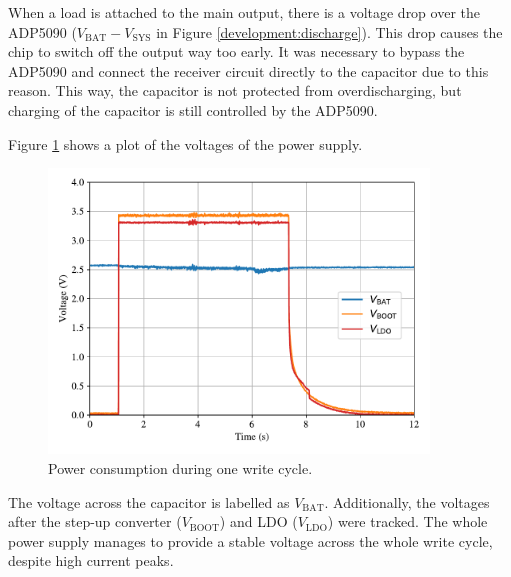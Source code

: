 When a load is attached to the main output, there is a voltage drop over the ADP5090 ($V_{\text{BAT}}-V_{\text{SYS}}$ in Figure \ref{development:discharge}). 
This drop causes the chip to switch off the output way too early.
It was necessary to bypass the ADP5090 and connect the receiver circuit directly to the capacitor due to this reason.
This way, the capacitor is not protected from overdischarging, but charging of the capacitor is still controlled by the ADP5090.

Figure \ref{results:v} shows a plot of the voltages of the power supply. 
\begin{figure}[ht]
	\centering
	\includegraphics[width=0.9\textwidth]{5-results/power_supply/plot/v.pdf}
	\caption{Power consumption during one write cycle.\label{results:v}}
\end{figure}
The voltage across the capacitor is labelled as $V_{\text{BAT}}$.
Additionally, the voltages after the step-up converter ($V_{\text{BOOT}}$) and LDO ($V_{\text{LDO}}$) were tracked.
The whole power supply manages to provide a stable voltage across the whole write cycle, despite high current peaks.